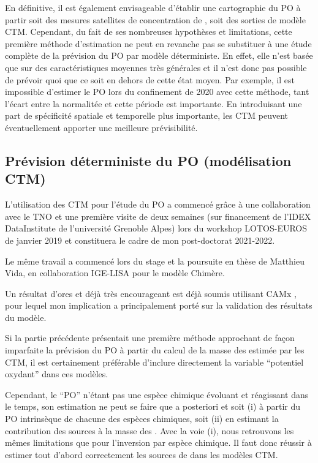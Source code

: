 \bigskip

En définitive, il est également envisageable d'établir une cartographie du PO à partir
soit des mesures satellites de concentration de \PMdix, soit des sorties de modèle CTM.
Cependant, du fait de ses nombreuses hypothèses et limitations, cette première méthode
d'estimation ne peut en revanche pas se substituer à une étude complète de la prévision du
PO par modèle déterministe.
En effet, elle n'est basée que sur des caractéristiques moyennes très générales et il
n'est donc pas possible de prévoir quoi que ce soit en dehors de cette état moyen. Par
exemple, il est impossible d'estimer le PO lors du confinement de 2020 avec cette
méthode, tant l'écart entre la normalitée et cette période est importante.
En introduisant une part de spécificité spatiale et temporelle plus importante, les CTM
peuvent éventuellement apporter une meilleure prévisibilité.

\subsection{Prévision déterministe du PO (modélisation CTM)}

\begin{tcolorbox}[colback=red!5!white,colframe=Melon,title=Note]
    L'utilisation des CTM pour l'étude du PO a commencé grâce à une collaboration avec le
    TNO et une première visite de deux semaines (sur financement de l'IDEX DataInstitute de l'université Grenoble Alpes) lors du
    workshop LOTOS-EUROS de janvier 2019 et constituera le cadre de mon post-doctorat 2021-2022.

    Le même travail a commencé lors du stage et la poursuite en thèse de Matthieu Vida, en
    collaboration IGE-LISA pour le modèle Chimère.

    Un résultat d'ores et déjà très encourageant est déjà soumis utilisant CAMx
    \parencite{daellenbachSourcessubmitted}, pour lequel mon implication a principalement
    porté sur la validation des résultats du modèle.
\end{tcolorbox}

Si la partie précédente présentait une première méthode approchant de façon imparfaite la prévision du PO à partir
du calcul de la masse des \PMdix{} estimée par les CTM, il est certainement
préférable d'inclure directement la variable ``potentiel oxydant'' dans ces modèles.

Cependant, le ``PO'' n'étant pas une espèce chimique évoluant et réagissant dans le temps, son
estimation ne peut se faire que a posteriori et soit (i) à partir du PO intrinsèque de chacune
des espèces chimiques, soit (ii) en estimant la contribution des sources à la masse des \PMdix.
Avec la voie (i), nous retrouvons les mêmes limitations que pour l'inversion par espèce chimique. Il faut donc
réussir à estimer tout d'abord correctement les sources de \PMdix{} dans les modèles CTM.

